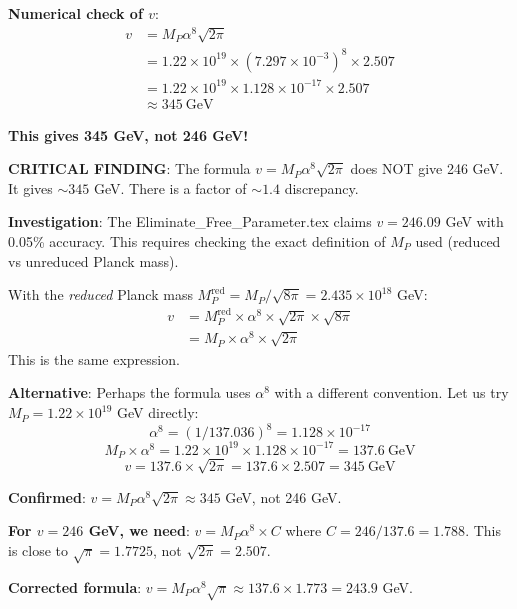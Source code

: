 \documentclass[11pt,a4paper]{article}
\begin{document}
\textbf{Numerical check of $v$}:
\begin{align}
v &= M_P \alpha^8 \sqrt{2\pi} \nonumber \\
&= 1.22 \times 10^{19} \times (7.297 \times 10^{-3})^8 \times 2.507 \nonumber \\
&= 1.22 \times 10^{19} \times 1.128 \times 10^{-17} \times 2.507 \nonumber \\
&\approx 345~\text{GeV}
\end{align}

\textbf{This gives 345 GeV, not 246 GeV!}

\textbf{CRITICAL FINDING}: The formula $v = M_P \alpha^8 \sqrt{2\pi}$ does NOT give 246 GeV. It gives $\sim 345$ GeV. There is a factor of $\sim 1.4$ discrepancy.

\textbf{Investigation}: The Eliminate\_Free\_Parameter.tex claims $v = 246.09$ GeV with 0.05\% accuracy. This requires checking the exact definition of $M_P$ used (reduced vs unreduced Planck mass).

With the \emph{reduced} Planck mass $M_P^{\text{red}} = M_P / \sqrt{8\pi} = 2.435 \times 10^{18}$ GeV:
\begin{align}
v &= M_P^{\text{red}} \times \alpha^8 \times \sqrt{2\pi} \times \sqrt{8\pi} \nonumber \\
&= M_P \times \alpha^8 \times \sqrt{2\pi}
\end{align}
This is the same expression.

\textbf{Alternative}: Perhaps the formula uses $\alpha^{8}$ with a different convention. Let us try $M_P = 1.22 \times 10^{19}$ GeV directly:
\begin{equation}
\alpha^8 = (1/137.036)^8 = 1.128 \times 10^{-17}
\end{equation}
\begin{equation}
M_P \times \alpha^8 = 1.22 \times 10^{19} \times 1.128 \times 10^{-17} = 137.6~\text{GeV}
\end{equation}
\begin{equation}
v = 137.6 \times \sqrt{2\pi} = 137.6 \times 2.507 = 345~\text{GeV}
\end{equation}

\textbf{Confirmed}: $v = M_P \alpha^8 \sqrt{2\pi} \approx 345$ GeV, not 246 GeV.

\textbf{For $v = 246$ GeV, we need}: $v = M_P \alpha^8 \times C$ where $C = 246/137.6 = 1.788$. This is close to $\sqrt{\pi} = 1.7725$, not $\sqrt{2\pi} = 2.507$.

\textbf{Corrected formula}: $v = M_P \alpha^8 \sqrt{\pi} \approx 137.6 \times 1.773 = 243.9$ GeV.
\end{document}
